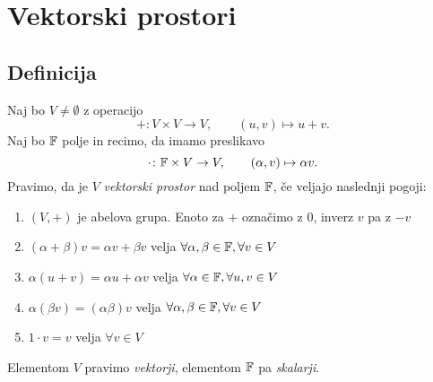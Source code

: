 \documentclass[12pt, a4paper]{article}
\begin{document}
\newpage

\section{Vektorski prostori}

\subsection{Definicija}

\begin{okvir}
\begin{definicija}
Naj bo $V\ne\emptyset$ z operacijo
\[
+\colon V\times V\to V,\qquad (u,v)\mapsto u+v.
\]
Naj bo $\mathbb{F}$ polje in recimo, da imamo preslikavo
\[
\cdot\colon \mathbb{F}\times V\to V,\qquad(\alpha,v)\mapsto\alpha v.
\]
Pravimo, da je $V$ \emph{vektorski prostor} nad poljem $\mathbb{F}$, če veljajo naslednji pogoji:

\begin{enumerate}[label=\arabic*)]
\item $(V,+)$ je abelova grupa. Enoto za $+$ označimo z $0$, inverz $v$ pa z $-v$
\item $(\alpha+\beta)v=\alpha v+\beta v$ velja $\forall\alpha,\beta\in \mathbb{F},\forall v\in V$
\item $\alpha(u+v)=\alpha u+\alpha v$ velja $\forall\alpha\in \mathbb{F},\forall u,v\in V$
\item $\alpha(\beta v)=(\alpha\beta)v$ velja $\forall\alpha,\beta\in \mathbb{F},\forall v\in V$
\item $1\cdot v=v$ velja $\forall v\in V$
\end{enumerate}
Elementom $V$ pravimo \emph{vektorji}, elementom $\mathbb{F}$ pa \emph{skalarji}.
\end{definicija}
\end{okvir}
\end{document}
